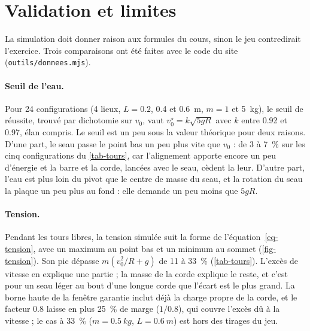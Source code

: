 
\section{Validation et limites}
\label{sec-validation}

La simulation doit donner raison aux formules du cours, sinon le jeu
contredirait l'exercice. Trois comparaisons ont été faites avec le code du
site (\texttt{outils/donnees.mjs}).

\paragraph{Seuil de l'eau.} Pour 24 configurations (4 lieux,
\(L = \num{0,2}\), \num{0,4} et \SI{0,6}{m}, \(m = 1\) et \SI{5}{kg}), le
seuil de réussite, trouvé par dichotomie sur \(v_0\), vaut
\(v_0^\star = k \sqrt{5 g R}\) avec \(k\) entre \num{0,92} et \num{0,97}, élan
compris. Le seuil est un peu sous la valeur théorique pour deux raisons. D'une
part, le seau passe le point bas un peu plus vite que \(v_0\) : de 3 à
\SI{7}{\percent} sur les cinq configurations du \cref{tab-tours}, car
l'alignement apporte encore un peu d'énergie et la barre et la corde, lancées
avec le seau, cèdent la leur. D'autre part, l'eau est plus loin du pivot que le
centre de masse du seau, et la rotation du seau la plaque un peu plus au fond :
elle demande un peu moins que \(5 g R\).

\paragraph{Tension.} Pendant les tours libres, la tension simulée suit la
forme de l'équation~\eqref{eq-tension}, avec un maximum au point bas et un
minimum au sommet (\cref{fig-tension}). Son pic dépasse
\(m (v_0^2/R + g)\) de 11 à \SI{33}{\percent} (\cref{tab-tours}). L'excès de
vitesse en explique une partie ; la masse de la corde explique le reste, et
c'est pour un seau léger au bout d'une longue corde que l'écart est le plus
grand. La borne haute de la fenêtre garantie inclut déjà la charge propre de la
corde, et le facteur \num{0,8} laisse en plus \SI{25}{\percent} de marge
(\(1/\num{0,8}\)), qui couvre l'excès dû à la vitesse ; le cas à
\SI{33}{\percent} (\(m = \SI{0,5}{kg}\), \(L = \SI{0,6}{m}\)) est hors des
tirages du jeu.

